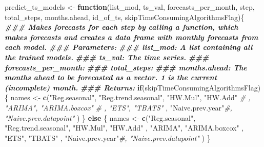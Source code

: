 \documentclass[
]{article}
\newenvironment{Shaded}{\begin{snugshade}}{\end{snugshade}}
\newcommand{\CommentTok}[1]{\textcolor[rgb]{0.56,0.35,0.01}{\textit{#1}}}
\newcommand{\ControlFlowTok}[1]{\textcolor[rgb]{0.13,0.29,0.53}{\textbf{#1}}}
\newcommand{\DocumentationTok}[1]{\textcolor[rgb]{0.56,0.35,0.01}{\textbf{\textit{#1}}}}
\newcommand{\FunctionTok}[1]{\textcolor[rgb]{0.13,0.29,0.53}{\textbf{#1}}}
\newcommand{\NormalTok}[1]{#1}
\newcommand{\OtherTok}[1]{\textcolor[rgb]{0.56,0.35,0.01}{#1}}
\newcommand{\StringTok}[1]{\textcolor[rgb]{0.31,0.60,0.02}{#1}}
\begin{document}
\begin{Shaded}
\begin{Highlighting}[]
\NormalTok{predict\_ts\_models }\OtherTok{\textless{}{-}} \ControlFlowTok{function}\NormalTok{(list\_mod, ts\_val, forecasts\_per\_month, step, total\_steps, months.ahead, id\_of\_ts, skipTimeConsumingAlgorithmsFlag)\{}
\DocumentationTok{\#\#\# Makes forecasts for each step by calling a function, which makes forecasts and creates a data frame with monthly forecasts from each model.}
\DocumentationTok{\#\#\# Parameters:}
\DocumentationTok{\#\#\# list\_mod: A list containing all the trained models.}
\DocumentationTok{\#\#\# ts\_val: The time series.}
\DocumentationTok{\#\#\# forecasts\_per\_month:}
\DocumentationTok{\#\#\# total\_steps: }
\DocumentationTok{\#\#\# months.ahead: The months ahead to be forecasted as a vector. 1 is the current (incomplete) month.}
\DocumentationTok{\#\#\# Returns: }
  \ControlFlowTok{if}\NormalTok{(skipTimeConsumingAlgorithmsFlag) \{}
\NormalTok{  names }\OtherTok{\textless{}{-}} \FunctionTok{c}\NormalTok{(}\StringTok{"Reg.seasonal"}\NormalTok{, }\StringTok{"Reg.trend.seasonal"}\NormalTok{,}
             \StringTok{"HW.Mul"}\NormalTok{, }\StringTok{"HW.Add"}
             \CommentTok{\# , "ARIMA", "ARIMA.boxcox"}
             \CommentTok{\# , "ETS", "TBATS"}
\NormalTok{             , }\StringTok{"Naive.prev.year"}\CommentTok{\#, "Naive.prev.datapoint"}
\NormalTok{             )}
\NormalTok{  \} }\ControlFlowTok{else}\NormalTok{ \{}
\NormalTok{    names }\OtherTok{\textless{}{-}} \FunctionTok{c}\NormalTok{(}\StringTok{"Reg.seasonal"}\NormalTok{, }\StringTok{"Reg.trend.seasonal"}\NormalTok{,}
               \StringTok{"HW.Mul"}\NormalTok{, }\StringTok{"HW.Add"}
\NormalTok{               , }\StringTok{"ARIMA"}\NormalTok{, }\StringTok{"ARIMA.boxcox"}
\NormalTok{               , }\StringTok{"ETS"}\NormalTok{, }\StringTok{"TBATS"}
\NormalTok{               , }\StringTok{"Naive.prev.year"}\CommentTok{\#, "Naive.prev.datapoint"}
\NormalTok{    )}
\NormalTok{  \}}
  

\end{Highlighting}
\end{Shaded}
\end{document}
